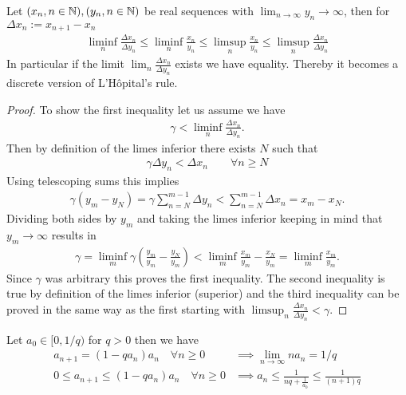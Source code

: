 \begin{theorem}\label{thm-appendix: cesaro-stolz}
	Let \((x_n, n\in\mathbb{N}),(y_n, n\in\mathbb{N})\) be real sequences with
	\(\lim_{n\to\infty}y_n\to\infty\), then for \(\Delta x_n:=x_{n+1}-x_n\)
	\begin{align}
		\liminf_n \frac{\Delta x_n}{\Delta y_n}
		\le \liminf_n \frac{x_n}{y_n} 
		\le \limsup_n \frac{x_n}{y_n} 
		\le \limsup_n \frac{\Delta x_n}{\Delta y_n}
	\end{align}
	In particular if the limit \(\lim_n\frac{\Delta x_n}{\Delta y_n}\) exists
	we have equality. Thereby it becomes a discrete version of L'Hôpital's
	rule.
\end{theorem}
\begin{proof}
	To show the first inequality let us assume we have
	\begin{align*}
		\gamma < \liminf_n \frac{\Delta x_n}{\Delta y_n}.
	\end{align*}
	Then by definition of the limes inferior there exists \(N\) such that
	\begin{align*}
		\gamma \Delta y_n < \Delta x_n \qquad \forall n\ge N
	\end{align*}
	Using telescoping sums this implies
	\begin{align*}
		\gamma (y_m- y_N)
		= \gamma \sum_{n=N}^{m-1} \Delta y_n
		< \sum_{n=N}^{m-1} \Delta x_n
		= x_m- x_N.
	\end{align*}
	Dividing both sides by \(y_m\) and taking the limes inferior keeping in
	mind that \(y_m\to\infty\) results in
	\begin{align*}
		\gamma = \liminf_m \gamma\left(\frac{y_m}{y_m} - \frac{y_N}{y_m}\right)
		< \liminf_m \frac{x_m}{y_m} - \frac{x_N}{y_m}
		= \liminf_m \frac{x_m}{y_m}.
	\end{align*}
	Since \(\gamma\) was arbitrary this proves the first inequality. The second
	inequality is true by definition of the limes inferior (superior) and the
	third inequality can be proved in the same way as the first starting with
	\(\limsup_n \frac{\Delta x_n}{\Delta y_n} < \gamma\).
\end{proof}
\begin{lemma}\label{lem-appendix: diminishing contraction}
	Let \(a_0 \in [0, 1/q)\) for \(q>0\) then we have
	\begin{align}
		\label{eq-appdx: asymptotic behavior of diminishing contraction}
		a_{n+1} = (1-q a_n)a_n \quad \forall n \ge 0
		&\implies \lim_{n\to\infty} n a_n = 1/q\\
		\label{eq-appdx: upper bound on diminishing contraction}
		0\le a_{n+1} \le (1-q a_n)a_n \quad \forall n \ge 0
		&\implies
		a_n \le \frac{1}{nq + \frac1{a_0}}\le\frac1{(n+1)q}
	\end{align}
\end{lemma}
